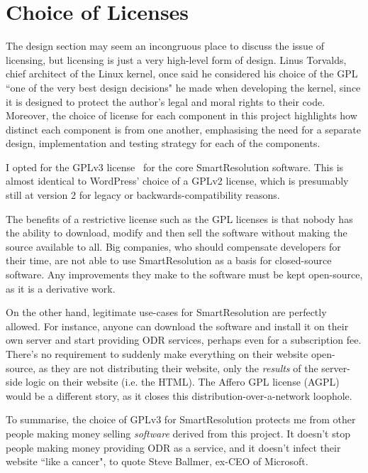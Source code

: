 \section{Choice of Licenses}

The design section may seem an incongruous place to discuss the issue of licensing, but licensing is just a very high-level form of design. Linus Torvalds, chief architect of the Linux kernel, once said he considered his choice of the GPL ``one of the very best design decisions" he made when developing the kernel, since it is designed to protect the author's legal and moral rights to their code. Moreover, the choice of license for each component in this project highlights how distinct each component is from one another, emphasising the need for a separate design, implementation and testing strategy for each of the components. %

I opted for the GPLv3 license~\cite{license:gplv3} for the core SmartResolution software. This is almost identical to WordPress' choice of a GPLv2 license, which is presumably still at version 2 for legacy or backwards-compatibility reasons.

The benefits of a restrictive license such as the GPL licenses is that nobody has the ability to download, modify and then sell the software without making the source available to all. Big companies, who should compensate developers for their time, are not able to use SmartResolution as a basis for closed-source software. Any improvements they make to the software must be kept open-source, as it is a derivative work.

On the other hand, legitimate use-cases for SmartResolution are perfectly allowed. For instance, anyone can download the software and install it on their own server and start providing ODR services, perhaps even for a subscription fee. There's no requirement to suddenly make everything on their website open-source, as they are not distributing their website, only the \emph{results} of the server-side logic on their website (i.e. the HTML). The Affero GPL license (AGPL) would be a different story, as it closes this distribution-over-a-network loophole.~\cite{license:agpl}

To summarise, the choice of GPLv3 for SmartResolution protects me from other people making money selling \emph{software} derived from this project. It doesn't stop people making money providing ODR as a service, and it doesn't infect their website ``like a cancer", to quote Steve Ballmer, ex-CEO of Microsoft.~\cite{linuxCancer}

